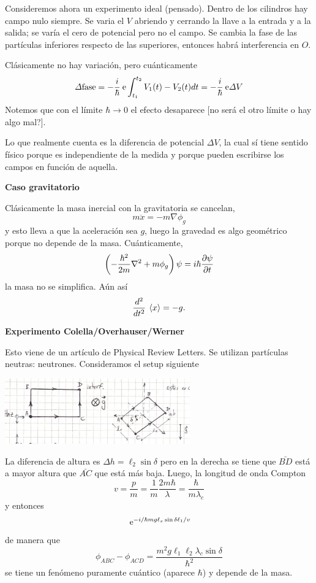 \documentclass[10pt,oneside]{CBFT_book}
\begin{document}
Consideremos ahora un experimento ideal (pensado). 
Dentro de los cilindros hay campo nulo siempre. Se varia el $V$ abriendo y cerrando la 
llave a la entrada y a la salida; se varía el cero de potencial pero no el campo.
Se cambia la fase de las partículas inferiores respecto de las superiores, entonces habrá 
interferencia en $O$.

Clásicamente no hay variación, pero cuánticamente
\[
	\Delta \text{fase} = -\frac{i}{\hbar}\euler \int _{t_1}^{t_2} V_1(t) - V_2(t) dt = 
	-\frac{i}{\hbar}\euler \Delta V
\]
Notemos que con el límite $\hbar \to 0$ el efecto desaparece [no será el otro límite o hay algo mal?].

Lo que realmente cuenta es la diferencia de potencial $\Delta V$, la cual sí tiene sentido 
físico porque es independiente de la medida y porque pueden escribirse los campos en función de aquella.

\begin{ejemplo}{\bf Caso gravitatorio}
 
Clásicamente la masa inercial con la gravitatoria se cancelan,
\[
	m \ddot{x} = - m \nabla \phi_g
\]
y esto lleva a que la aceleración sea $g$, luego la gravedad es algo geométrico porque no depende de la masa.
Cuánticamente,
\[
	\left( -\frac{\hbar^2}{2m}\nabla^2 + m \phi_g \right) \psi = i \hbar \dpar{\psi}{t}
\]
la masa no se simplifica. Aún así 
\[
	\dtot[2]{}{t} \vm{x} = - g.
\]

 
\end{ejemplo}


\begin{ejemplo}{\bf Experimento Colella/Overhauser/Werner}

Esto viene de un artículo de Physical Review Letters.
Se utilizan partículas neutras: neutrones.
Consideramos el setup siguiente
 
\includegraphics[width=0.6\textwidth]{images/fig_ft2_colella.jpg} 

La diferencia de altura es $\Delta h = \ell_2 \sin \delta $ pero en la derecha se tiene que
$\bar{BD}$ está a mayor altura que $\bar{AC}$ que está más baja.
Luego, la longitud de onda Compton
\[
	v = \frac{p}{m} = \frac{1}{m} \frac{2m\hbar}{\lambda} = \frac{\hbar}{m\lambda_c}
\]
y entonces
\[
	\euler^{ - i/\hbar m g \ell_x \sin \delta \ell_1/v }
\]
de manera que
\[
	\phi_{ABC} - \phi_{ACD} = 
	\frac{ m^2 g \ell_1 \ell_2 \lambda_c \sin \delta }{\hbar^2}
\]
se tiene un fenómeno puramente cuántico (aparece $\hbar$) y depende de la masa.
  
\end{ejemplo}
\end{document}
